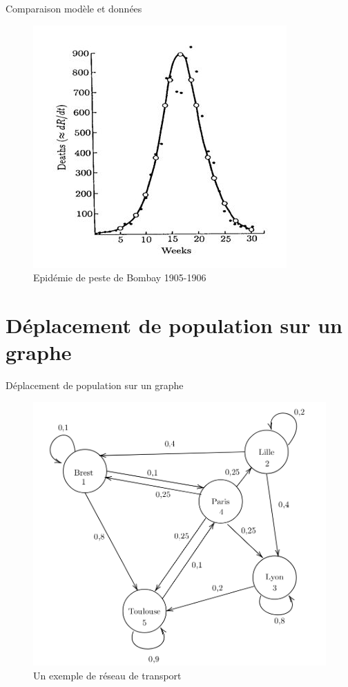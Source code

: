 \documentclass{beamer}
\theoremstyle{plain}
\theoremstyle{definition}
\theoremstyle{remark}
\begin{document}
\begin{frame}{Comparaison modèle et données}
\begin{figure}
    \centering
    \includegraphics[scale=0.7]{bombay.png}
    \caption{Epidémie de peste de Bombay 1905-1906}
    \label{fig:my_label}
\end{figure}{}
    
\end{frame}{}
\section{Déplacement de population sur un graphe}
\begin{frame}{Déplacement de population sur un graphe}
 \begin{figure}
     \centering
     \includegraphics[scale=0.9]{graphe.png}
     \caption{Un exemple de réseau de transport}
 \end{figure}{}
\end{frame}
\end{document}
